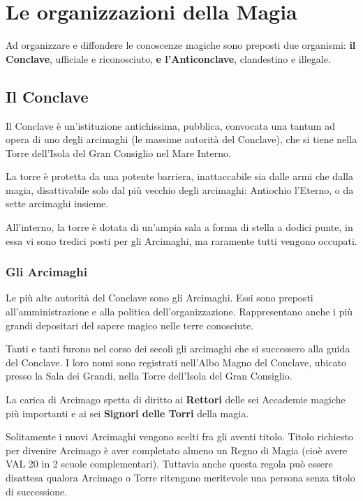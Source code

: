 {\raggedright \section{Le organizzazioni della Magia}}

Ad organizzare e diffondere le conoscenze magiche sono preposti due
organismi: \textbf{il Conclave}, ufficiale e riconosciuto, \textbf{e
  l'Anticonclave}, clandestino e illegale.

\subsection{Il Conclave}

Il Conclave \`e un'istituzione antichissima, pubblica, convocata una
tantum ad opera di uno degli arcimaghi (le massime autorit\`a del
Conclave), che si tiene nella Torre dell'Isola del Gran Consiglio nel
Mare Interno.

\iffullversion
La torre \`e protetta da una potente barriera, inattaccabile
sia dalle armi che dalla magia, disattivabile solo dal pi\`u vecchio degli
arcimaghi: Antiochio l'Eterno, o da sette arcimaghi insieme. 

All'interno, la torre \`e dotata di un'ampia sala a forma di stella
a dodici punte, in essa vi sono tredici posti per gli Arcimaghi,
ma raramente tutti vengono occupati.
\fi

\subsubsection{Gli Arcimaghi} 

Le pi\`u alte autorit\`a del Conclave sono gli Arcimaghi. Essi
sono preposti all'amministrazione e alla politica dell'organizzazione.
Rappresentano anche i pi\`u grandi depositari del sapere magico
nelle terre conosciute.

\iffullversion
Tanti e tanti furono nel corso dei secoli gli arcimaghi che si
successero alla guida del Conclave. I loro nomi sono registrati
nell'Albo Magno del Conclave, ubicato presso la Sala dei Grandi, nella
Torre dell'Isola del Gran Consiglio.

La carica di Arcimago spetta di diritto ai \textbf{Rettori} delle sei
Accademie magiche pi\`u importanti e ai sei \textbf{Signori delle
  Torri} della magia. 

Solitamente i nuovi Arcimaghi vengono scelti fra gli aventi titolo.
Titolo richiesto per divenire Arcimago \`e aver completato almeno un
Regno di Magia (cio\`e avere VAL 20 in 2 scuole complementari).
Tuttavia anche questa regola pu\`o essere disattesa qualora Arcimago
o Torre ritengano meritevole una persona senza titolo di successione.

